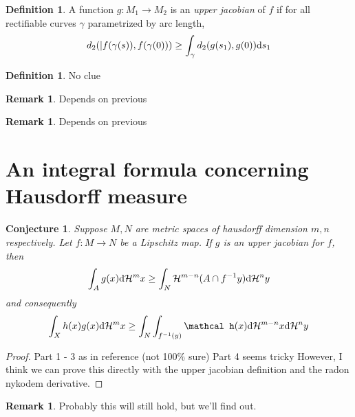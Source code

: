 \documentclass{article}
\theoremstyle{plain}
\newtheorem{conj}[thm]{Conjecture}
\theoremstyle{definition}
\newtheorem{defn}[thm]{Definition}
\newtheorem{rem}[thm]{Remark}
\renewcommand{\(}{\left(}
\renewcommand{\)}{\right)}
\renewcommand{\d}{\textrm d}
\begin{document}
\begin{defn}\label{def:upper-jacobian} %
  A function $g : M_1 \rightarrow M_2$ is an \emph{upper jacobian} of $f$ if for all rectifiable curves $\gamma$ parametrized by arc length,
  $$d_2(\vert f(\gamma(s)), f(\gamma(0))) \geq \int_\gamma d_2(g(s_1), g(0))\d s_1 $$
\end{defn}
\begin{defn}
  No clue
\end{defn}
\begin{rem}
  Depends on previous
\end{rem}
\begin{rem}
  Depends on previous
\end{rem}
\section{An integral formula concerning Hausdorff measure}
\begin{conj}
  Suppose $M,N$ are metric spaces of hausdorff dimension $m,n$ respectively. Let $f : M \rightarrow N$ be a Lipschitz map.
  If $g$ is an upper jacobian for $f$, then
  \begin{align*}
    \int_A g(x) \d\mathcal H^mx \geq \int_N \mathcal H^{m-n}(A \cap f^{-1}{y})\d\mathcal H^ny
  \end{align*}
  and consequently
  \begin{align*}
    \int_X h(x)g(x) \d\mathcal H^mx \geq \int_N\int_{f^{-1}(y)}\mathcal h(x)\d\mathcal H^{m-n}x\d\mathcal H^ny
  \end{align*}
\end{conj}
\begin{proof}
  Part 1 - 3 as in reference (not 100\% sure)
  Part 4 seems tricky
  However, I think we can prove this directly with the upper jacobian definition and the radon nykodem derivative.
\end{proof}
\begin{rem}
  Probably this will still hold, but we'll find out.
\end{rem}
\end{document}
